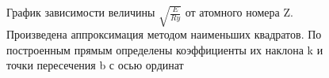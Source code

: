 \documentclass[a4paper, 12pt]{article}%
\begin{document}
\begin{enumerate}
		
		\begin{figure}[H]
			\caption{График зависимости величины $\sqrt{\frac{E}{Ry}}$ от атомного номера Z. Произведена аппроксимация методом наименьших квадратов. По построенным прямым определены коэффициенты их наклона k и точки пересечения b с осью ординат}
		\end{figure}
		
		
		
		
		
		
		
		
		
		
		
		
		
		
		
		
		
		
		
		
		
		
		
		
		
		
	\end{enumerate}
	
	
	
	
	
	
	
	
	
	
	
	
	
	
	
\end{document}
